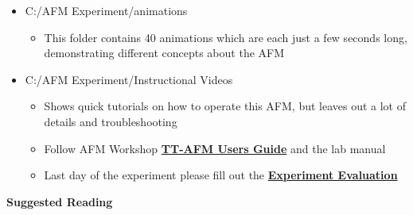 \documentclass{../lab}
\begin{document}
\begin{itemize}
    \item C:/AFM Experiment/animations

    \begin{itemize}
        \item This folder contains 40 animations which are each just a few seconds long, demonstrating different concepts about the AFM

    \end{itemize}

    \item C:/AFM Experiment/Instructional Videos

    \begin{itemize}
        \item Shows quick tutorials on how to operate this AFM, but leaves out a lot of details and troubleshooting

        \item Follow AFM Workshop \href{http://experimentationlab.berkeley.edu/tt-afmuserguidev2.2}{\textbf{TT-AFM Users Guide}} and the  lab manual

        \item Last day of the experiment please fill out the \href{\ExperimentEvaluation}{\textbf{Experiment Evaluation}}

    \end{itemize}

\end{itemize}

\textbf{Suggested Reading}
\end{document}
